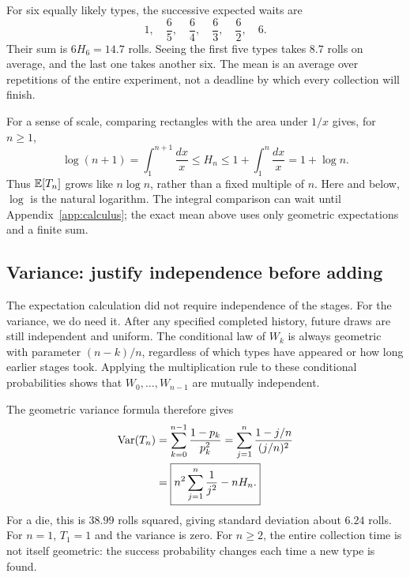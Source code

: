 \begin{example}
For six equally likely types, the successive expected waits are
\[
 1,\quad\frac65,\quad\frac64,\quad\frac63,\quad\frac62,\quad6.
\]
Their sum is $6H_6=14.7$ rolls. Seeing the first five types takes $8.7$
rolls on average, and the last one takes another six.
The mean is an average over repetitions of the entire experiment,
not a deadline by which every collection will finish.
\end{example}

For a sense of scale, comparing rectangles with the area under $1/x$
gives, for $n\ge1$,
\[
 \log(n+1)=\int_1^{n+1}\frac{dx}{x}
 \le H_n\le1+\int_1^n\frac{dx}{x}=1+\log n.
\]
Thus $\mathbb E[T_n]$ grows like $n\log n$, rather than a fixed multiple of $n$.
Here and below, $\log$ is the natural logarithm. The integral comparison
can wait until Appendix~\ref{app:calculus}; the exact mean above uses
only geometric expectations and a finite sum.

\subsection*{Variance: justify independence before adding}
The expectation calculation did not require independence of the stages.
For the variance, we do need it. After any specified completed history,
future draws are still independent and uniform. The conditional law of
$W_k$ is always geometric with parameter $(n-k)/n$, regardless of which
types have appeared or how long earlier stages took. Applying the
multiplication rule to these conditional probabilities shows that
$W_0,\ldots,W_{n-1}$ are mutually independent.

The geometric variance formula therefore gives
\begin{align*}
 \operatorname{Var}(T_n)
 &=\sum_{k=0}^{n-1}\frac{1-p_k}{p_k^2}
   =\sum_{j=1}^n\frac{1-j/n}{(j/n)^2}\\
 &=\boxed{n^2\sum_{j=1}^n\frac1{j^2}-nH_n.}
\end{align*}
For a die, this is $38.99$ rolls squared, giving standard deviation
about $6.24$ rolls. For $n=1$, $T_1=1$ and the variance is zero.
For $n\ge2$, the entire collection time is not itself geometric:
the success probability changes each time a new type is found.

